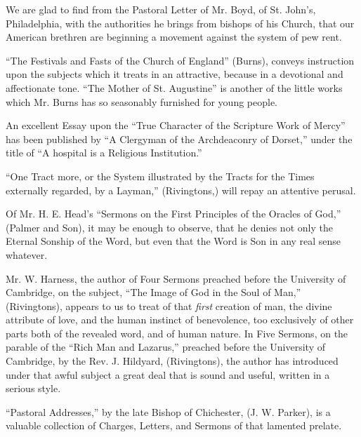 We are glad to find from the Pastoral Letter of Mr.
Boyd, of St. John's, Philadelphia, with the authorities he brings from
bishops of his Church, that our American brethren are beginning a
movement against the system of pew rent.

``The Festivals and Fasts of the Church of England''
(Burns), conveys instruction upon the subjects which it treats in an
attractive, because in a devotional and affectionate tone. ``The Mother
of St. Augustine'' is another of the little works which Mr. Burns has so
seasonably furnished for young people.

An excellent Essay upon the ``True Character of the
Scripture Work of Mercy'' has been published by ``A Clergyman of the
Archdeaconry of Dorset,'' under the title of ``A hospital is a Religious
Institution.''

``One Tract more, or the System illustrated by the
Tracts for the Times externally regarded, by a Layman,'' (Rivingtons,)
will repay an attentive perusal.

Of Mr. H. E. Head's ``Sermons on the First
Principles of the Oracles of God,'' (Palmer and Son), it may be enough to
observe, that he denies not only the Eternal Sonship of the Word, but
even that the Word is Son in any real sense whatever.

Mr. W. Harness, the author of Four Sermons preached
before the University of Cambridge, on the subject, ``The Image of God in
the Soul of Man,'' (Rivingtons), appears to us to treat of that \emph{first}
creation of man, the divine attribute of love, and the human instinct of
benevolence, too exclusively of other parts both of the revealed word,
and of human nature. In Five Sermons, on the parable of the ``Rich Man
and Lazarus,'' preached before the University of Cambridge, by the Rev.
J. Hildyard, (Rivingtons), the author has introduced under that awful
subject a great deal that is sound and useful, written in a serious
style.

``Pastoral Addresses,'' by the late Bishop of
Chichester, (J. W. Parker), is a valuable collection of Charges,
Letters, and Sermons of that lamented prelate.

